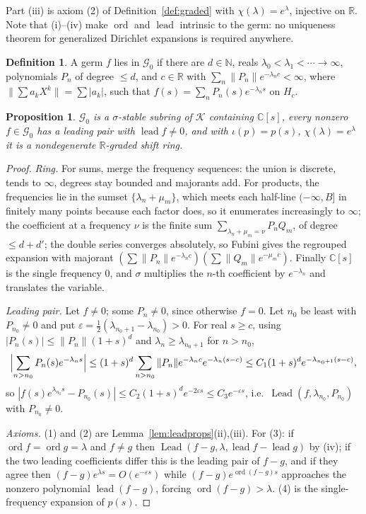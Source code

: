 \documentclass[11pt,a4paper]{amsart}
\theoremstyle{plain}
\newtheorem{proposition}[theorem]{Proposition}
\theoremstyle{definition}
\newtheorem{definition}[theorem]{Definition}
\newcommand{\CC}{\mathbb{C}}
\newcommand{\RR}{\mathbb{R}}
\newcommand{\NN}{\mathbb{N}}
\newcommand{\sig}{\sigma}
\newcommand{\ord}{\operatorname{ord}}
\newcommand{\lead}{\operatorname{lead}}
\newcommand{\GG}{\mathcal{G}}
\begin{document}
Part (iii) is axiom (2) of Definition~\ref{def:graded} with $\chi(\lambda)=e^{\lambda}$, injective on
$\RR$. Note that (i)--(iv) make $\ord$ and $\lead$ intrinsic to the germ: no uniqueness theorem for
generalized Dirichlet expansions is required anywhere.

\begin{definition}\label{def:gds}
A germ $f$ lies in $\GG_0$ if there are $d\in\NN$, reals $\lambda_0<\lambda_1<\cdots\to\infty$,
polynomials $P_n$ of degree $\le d$, and $c\in\RR$ with $\sum_n\|P_n\|e^{-\lambda_nc}<\infty$, where
$\|\sum a_kX^k\|=\sum|a_k|$, such that $f(s)=\sum_nP_n(s)e^{-\lambda_ns}$ on $H_c$.
\end{definition}

\begin{proposition}\label{prop:gdsring}
$\GG_0$ is a $\sig$-stable subring of $\mathcal K$ containing $\CC[s]$, every nonzero $f\in\GG_0$ has
a leading pair with $\lead f\neq0$, and with $\iota(p)=p(s)$, $\chi(\lambda)=e^{\lambda}$ it is a
nondegenerate $\RR$-graded shift ring.
\end{proposition}

\begin{proof}
\emph{Ring.} For sums, merge the frequency sequences: the union is discrete, tends to $\infty$,
degrees stay bounded and majorants add. For products, the frequencies lie in the sumset
$\{\lambda_n+\mu_m\}$, which meets each half-line $(-\infty,B]$ in finitely many points because each
factor does, so it enumerates increasingly to $\infty$; the coefficient at a frequency $\nu$ is the
finite sum $\sum_{\lambda_n+\mu_m=\nu}P_nQ_m$, of degree $\le d+d'$; the double series converges
absolutely, so Fubini gives the regrouped expansion with majorant
$(\sum\|P_n\|e^{-\lambda_nc})(\sum\|Q_m\|e^{-\mu_mc})$. Finally $\CC[s]$ is the single frequency $0$,
and $\sig$ multiplies the $n$-th coefficient by $e^{-\lambda_n}$ and translates the variable.

\emph{Leading pair.} Let $f\neq0$; some $P_n\neq0$, since otherwise $f=0$. Let $n_0$ be least with
$P_{n_0}\neq0$ and put $\varepsilon=\tfrac12(\lambda_{n_0+1}-\lambda_{n_0})>0$. For real $s\ge c$,
using $|P_n(s)|\le\|P_n\|(1+s)^d$ and $\lambda_n\ge\lambda_{n_0+1}$ for $n>n_0$,
\[
  \Bigl|\sum_{n>n_0}P_n(s)e^{-\lambda_ns}\Bigr|
   \le(1+s)^d\sum_{n>n_0}\|P_n\|e^{-\lambda_nc}e^{-\lambda_n(s-c)}
   \le C_1(1+s)^de^{-\lambda_{n_0+1}(s-c)} ,
\]
so $|f(s)e^{\lambda_{n_0}s}-P_{n_0}(s)|\le C_2(1+s)^de^{-2\varepsilon s}\le C_3e^{-\varepsilon s}$,
i.e.\ $\operatorname{Lead}(f,\lambda_{n_0},P_{n_0})$ with $P_{n_0}\neq0$.

\emph{Axioms.} (1) and (2) are Lemma~\ref{lem:leadprops}(ii),(iii). For (3): if $\ord f=\ord
g=\lambda$ and $f\neq g$ then $\operatorname{Lead}(f-g,\lambda,\lead f-\lead g)$ by (iv); if the two
leading coefficients differ this is the leading pair of $f-g$, and if they agree then
$(f-g)e^{\lambda s}=O(e^{-\varepsilon s})$ while $(f-g)e^{\ord(f-g)s}$ approaches the nonzero
polynomial $\lead(f-g)$, forcing $\ord(f-g)>\lambda$. (4) is the single-frequency expansion of
$p(s)$.
\end{proof}
\end{document}
